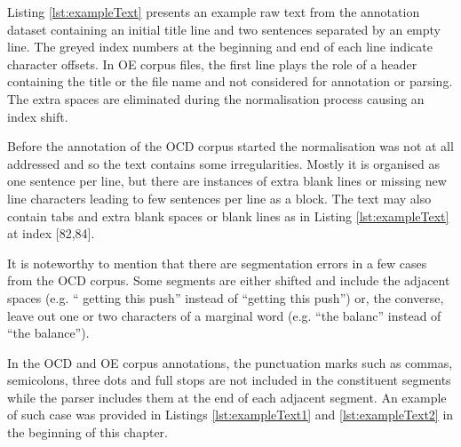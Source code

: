     Listing \ref{lst:exampleText} presents an example raw text from the annotation dataset containing an initial title line and two sentences separated by an empty line. The greyed index numbers at the beginning and end of each line indicate character offsets. In OE corpus files, the first line plays the role of a header containing the title or the file name and not considered for annotation or parsing. The extra spaces are eliminated during the normalisation process causing an index shift. 
    
    Before the annotation of the OCD corpus started the normalisation was not at all addressed and so the text contains some irregularities. Mostly it is organised as one sentence per line, but there are instances of extra blank lines or missing new line characters leading to few sentences per line as a block. The text may also contain tabs and extra blank spaces or blank lines as in Listing \ref{lst:exampleText} at index [82,84]. 

    It is noteworthy to mention that there are segmentation errors in a few cases from the OCD corpus. Some segments are either shifted and include the adjacent spaces (e.g. `` getting this push'' instead of ``getting this push'') or, the converse, leave out one or two characters of a marginal word (e.g. ``the balanc'' instead of ``the balance'').  


    In the OCD and OE corpus annotations, the punctuation marks such as commas, semicolons, three dots and full stops are not included in the constituent segments while the parser includes them at the end of each adjacent segment. An example of such case was provided in Listings \ref{lst:exampleText1} and \ref{lst:exampleText2} in the beginning of this chapter. 
    
